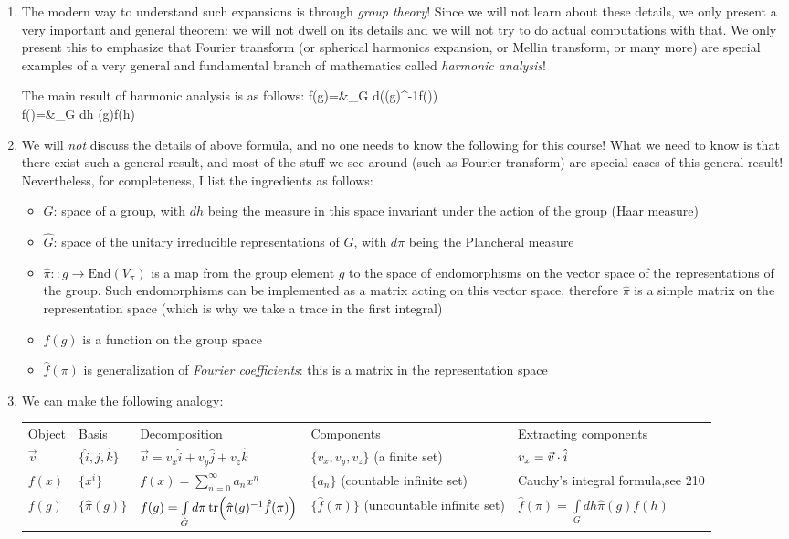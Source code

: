 {\begin{enumerate}
		\item The modern way to understand such expansions is through \emph{group theory}! Since we will not learn about these details, we only present a very important and general theorem: we will not dwell on its details and we will not try to do actual computations with that. We only present this to emphasize that Fourier transform (or spherical harmonics expansion, or Mellin transform, or many more) are special examples of a very general and fundamental branch of mathematics called \emph{harmonic analysis}!
		
		The main result of harmonic analysis is as follows:
		\bea 
		f(g)=&\int\limits_{\hat G} d\pi \tr(\hat\pi(g)^{-1}\hat f(\pi))\\
		\hat f(\pi)=&\int\limits_G dh \hat\pi(g)f(h)
		\eea 
		\item We will \emph{not} discuss the details of above formula, and no one needs to know the following for this course! What we need to know is that there exist such a general result, and most of the stuff we see around (such as Fourier transform) are special cases of this general result! Nevertheless, for completeness, I list the ingredients as follows:
		\begin{itemize}
			\item $G$: space of a group, with $dh$ being the measure in this space invariant under the action of the group (Haar measure)
			\item $\hat G$: space of the unitary irreducible representations of $G$, with $d\pi$ being the Plancheral measure
			\item $\hat\pi :: g\to\mathrm{End}(V_\pi)$ is a map from the group element $g$ to the space of endomorphisms on the vector space of the representations of the group. Such endomorphisms can be implemented as a matrix acting on this vector space, therefore $\hat\pi$ is a simple matrix on the representation space (which is why we take a trace in the first integral)
			\item $f(g)$ is a function on the group space
			\item $\hat f(\pi)$ is generalization of \emph{Fourier coefficients}: this is a matrix in the representation space
		\end{itemize}
		\item We can make the following analogy:\\
		\begin{tabular}{lllll}
			Object & Basis & Decomposition & Components& Extracting components\\ 
			$\vec{v}$ & $\{\hat i,\hat j,\hat k\}$ & $\vec{v}=v_x\hat i+v_y\hat j+v_z\hat k$ & $\{v_x,v_y,v_z\}$ (a finite set)& $v_x=\vec{v}\.\hat i$\\ 
			$f(x)$&$\{x^i\}$&$f(x)=\sum\limits_{n=0}^\infty a_n x^n$&$\{a_n\}$ (countable infinite set)& {\footnotesize Cauchy's integral formula,see 210}\\
			$f(g)$ &$\{\hat\pi(g)\}$& $f(g)=\int\limits_{\hat G} d\pi \tr(\hat\pi(g)^{-1}\hat f(\pi))$ & $\{\hat f(\pi)\}$ (uncountable infinite set)&$\hat f(\pi)=\int\limits_G dh \hat\pi(g)f(h)$
		\end{tabular}
		

\end{enumerate}}
